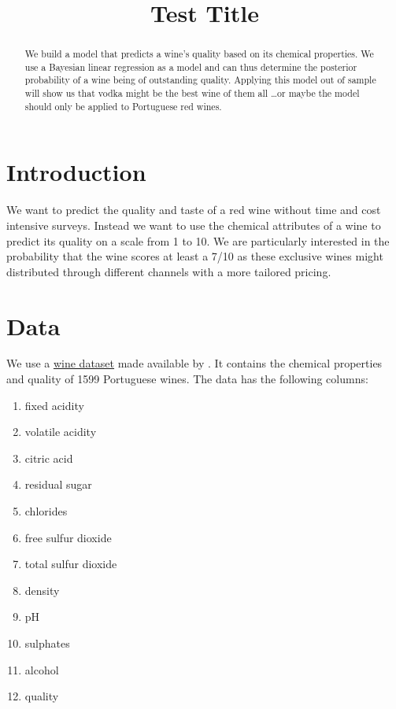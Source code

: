 \documentclass[a4paper,11pt]{article}
\title{Test Title}
\author{}
\begin{document}

\begin{abstract}
We build a model that predicts a wine's quality based on its chemical properties. We use a Bayesian linear regression as a model and can thus determine the posterior probability of a wine being of outstanding quality. Applying this model out of sample will show us that vodka might be the best wine of them all \dots or maybe the model should only be applied to Portuguese red wines.
\end{abstract}

\section{Introduction}

We want to predict the quality and taste of a red wine without time and cost intensive surveys. Instead we want to use the chemical attributes of a wine to predict its quality on a scale from 1 to 10.
We are particularly interested in the probability that the wine scores at least a 7/10 as these exclusive wines might distributed through different channels with a more tailored pricing.

\section{Data}
We use a \underline{\href{https://archive.ics.uci.edu/ml/datasets/wine+quality}{\color{blue}wine dataset}} made available by \cite{wine-data}. It contains the chemical properties and quality of 1599 Portuguese wines. The data has the following columns:
\begin{multicols}{3}
\begin{enumerate}
\item fixed acidity 
\item volatile acidity 
\item citric acid 
\item residual sugar 
\item chlorides 
\item free sulfur dioxide 
\item total sulfur dioxide 
\item density 
\item pH 
\item sulphates 
\item alcohol 
\item quality
\end{enumerate}
\end{multicols}
\end{document}
